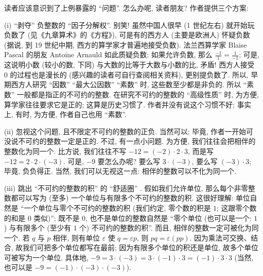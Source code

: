 \begin{remark}
    读者应该意识到了上例暴露的 ``问题''. 怎么办呢, 读者朋友? 作者提供三个方案:

    (i) ``剥夺'' 负整数的 ``因子分解权''. 别笑! 虽然中国人很早 (1 世纪左右) 就开始玩负数了 (见《九章算术》的《方程》), 可是有的西方人 (主要是欧洲人) 怀疑负数 (据说, 到 19 世纪中期, 西方的算学家才普遍地接受负数). 法兰西算学家 Blaise Pascal 的朋友 Antoine Arnauld 如此质疑负数: 如果允许负数, 那么 $\frac{-1}{1} = \frac{1}{-1}$; 可是, 这说明小数 (较小的数, 下同) 与大数的比等于大数与小数的比, 矛盾! 西方人接受 $0$ 的过程也是漫长的 (感兴趣的读者可自行查阅相关资料), 更别提负数了. 所以, 早期西方人研究 ``因数'' ``最大公因数'' ``素数'' 时, 这些数至少都是非负的. 所以 ``素数'' 一般都是指正的不可约的整数. 在研究不可约的整数的 ``高级性质'' 时, 为方便, 算学家往往要求它是正的; 这算是历史习惯了. 作者并没有说这个习惯不好; 事实上, 有时, 为方便, 作者自己也用 ``素数''.

    (ii) 忽视这个问题, 且不限定不可约的整数的正负. 当然可以; 毕竟, 作者一开始可没说不可约的整数一定是正的. 不过, 有一点小问题. 为方便, 我们往往会把相伴的整数化为同一个. 比方说, 我们往往不写 $-12 = (-2) \cdot 2 \cdot 3$, 而是写 $-12 = 2 \cdot 2 \cdot (-3)$. 可是, $-9$ 要怎么办呢? 要么写 $3 \cdot (-3)$, 要么写 $(-3) \cdot 3$; 毕竟, 负负得正. 当然, 我们可以无视这一点: 相伴的整数可以不化为同一个.

    (iii) 跳出 ``不可约的整数的积'' 的 ``舒适圈'' . 假如我们允许单位, 那么每个非零整数都可以写为 (至多) 一个单位与有限多个不可约的整数的积. 这很好理解: 单位自然是 ``一个单位与零个不可约的整数的积 (我们约定, 零个数的积是 $1$; 这跟零个数的和是 $0$ 类似)''; 既不是 $0$, 也不是单位的整数自然是 ``零个单位 (也可以是一个: $1$) 与有限多个 (至少有 $1$ 个) 不可约的整数的积''. 而且, 相伴的整数一定可被化为同一个. 若 $q$ 与 $p$ 相伴, 则有单位 $\varepsilon$ 使 $q = \varepsilon p$, 则 $pq = \varepsilon (pp)$. 因为乘法可交换、结合, 故我们可把多个单位都写在最前; 因为有限多个单位的积还是单位, 故多个单位可被写为一个单位. 具体地, $-9 = 3 \cdot (-3) = 3 \cdot (-1) \cdot 3 = (-1) \cdot 3 \cdot 3$ (当然, 也可以是 $-9 = (-1) \cdot (-3) \cdot (-3)$).
\end{remark}

